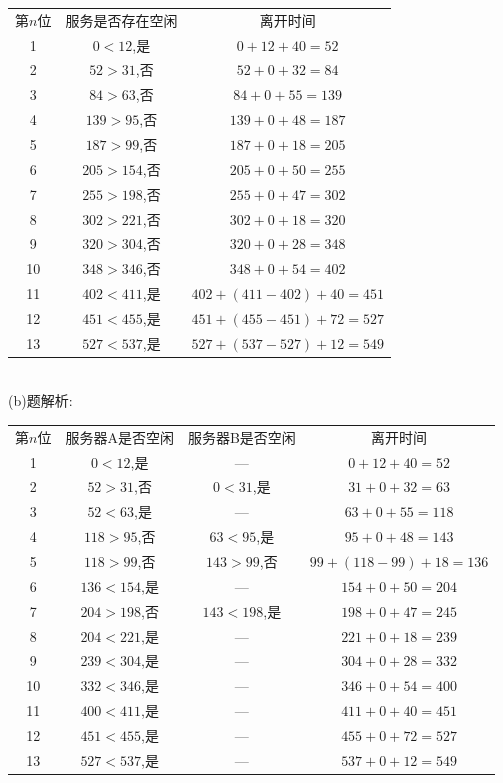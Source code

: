 \documentclass{book}
\begin{document}
\begin{tabular}{c c c}
    第$n$位 & 服务是否存在空闲      & 离开时间                   \\
    1     & $0 < 12$,是    & $0+12+40=52$           \\
    2     & $52 > 31$,否   & $52+0+32=84$           \\
    3     & $84 > 63$,否   & $84+0+55=139$          \\
    4     & $139 > 95$,否  & $139+0+48=187$         \\
    5     & $187 > 99$,否  & $187+0+18=205$         \\
    6     & $205 > 154$,否 & $205+0+50=255$         \\
    7     & $255 > 198$,否 & $255+0+47=302$         \\
    8     & $302 > 221$,否 & $302+0+18=320$         \\
    9     & $320 > 304$,否 & $320+0+28=348$         \\
    10    & $348 > 346$,否 & $348+0+54=402$         \\
    11    & $402 < 411$,是 & $402+(411-402)+40=451$ \\
    12    & $451 < 455$,是 & $451+(455-451)+72=527$ \\
    13    & $527 < 537$,是 & $527+(537-527)+12=549$ \\
\end{tabular}

\hspace*{\fill} \\
(b)题解析:\\
\begin{tabular}{c c c c}
    第$n$位 & 服务器A是否空闲      & 服务器B是否空闲      & 离开时间                 \\
    1     & $0 < 12$,是    & ---           & $0+12+40=52$         \\
    2     & $52 > 31$,否   & $0 < 31$,是    & $31+0+32=63$         \\
    3     & $52 < 63$,是   & ---           & $63+0+55=118$        \\
    4     & $118 > 95$,否  & $63 < 95$,是   & $95+0+48=143$        \\
    5     & $118 > 99$,否  & $143 > 99$,否  & $99+(118-99)+18=136$ \\
    6     & $136 < 154$,是 & ---           & $154+0+50=204$       \\
    7     & $204 > 198$,否 & $143 < 198$,是 & $198+0+47=245$       \\
    8     & $204 < 221$,是 & ---           & $221+0+18=239$       \\
    9     & $239 < 304$,是 & ---           & $304+0+28=332$       \\
    10    & $332 < 346$,是 & ---           & $346+0+54=400$       \\
    11    & $400 < 411$,是 & ---           & $411+0+40=451$       \\
    12    & $451 < 455$,是 & ---           & $455+0+72=527$       \\
    13    & $527 < 537$,是 & ---           & $537+0+12=549$       \\
\end{tabular}
\end{document}
